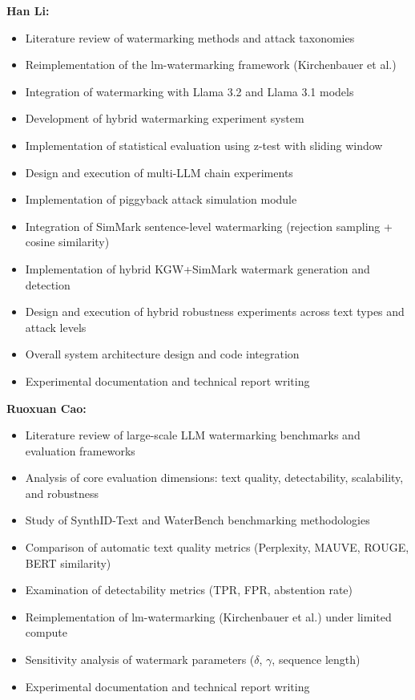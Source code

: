 \documentclass[12pt,letterpaper]{article}
\begin{document}
\noindent\textbf{Han Li:}
\begin{itemize}
    \item Literature review of watermarking methods and attack taxonomies
    \item Reimplementation of the lm-watermarking framework (Kirchenbauer et al.)
    \item Integration of watermarking with Llama 3.2 and Llama 3.1 models
    \item Development of hybrid watermarking experiment system
    \item Implementation of statistical evaluation using z-test with sliding window
    \item Design and execution of multi-LLM chain experiments
    \item Implementation of piggyback attack simulation module
    \item Integration of SimMark sentence-level watermarking (rejection sampling + cosine similarity)
    \item Implementation of hybrid KGW+SimMark watermark generation and detection
    \item Design and execution of hybrid robustness experiments across text types and attack levels
    \item Overall system architecture design and code integration
    \item Experimental documentation and technical report writing
\end{itemize}

\vspace{0.5cm}
\noindent\textbf{Ruoxuan Cao:}
\begin{itemize}
    \item Literature review of large-scale LLM watermarking benchmarks and evaluation frameworks
    \item Analysis of core evaluation dimensions: text quality, detectability, scalability, and robustness
    \item Study of SynthID-Text and WaterBench benchmarking methodologies
    \item Comparison of automatic text quality metrics (Perplexity, MAUVE, ROUGE, BERT similarity)
    \item Examination of detectability metrics (TPR, FPR, abstention rate)
    \item Reimplementation of lm-watermarking (Kirchenbauer et al.) under limited compute
    \item Sensitivity analysis of watermark parameters ($\delta$, $\gamma$, sequence length)
    \item Experimental documentation and technical report writing
\end{itemize}
\end{document}
